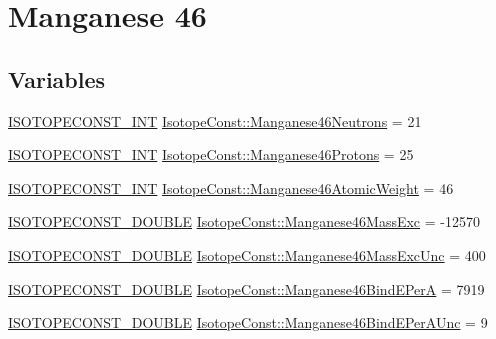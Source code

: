 \hypertarget{group___isotope_const-_manganese-_mn46}{}\section{Manganese 46}
\label{group___isotope_const-_manganese-_mn46}
\subsection*{Variables}
\begin{DoxyCompactItemize}
\item 
\mbox{\hyperlink{group___isotope_const-_macros_ga5f18360b3e99483a35c32d789e62621c}{I\+S\+O\+T\+O\+P\+E\+C\+O\+N\+S\+T\+\_\+\+I\+NT}} \mbox{\hyperlink{group___isotope_const-_manganese-_mn46_gaca758ecd628b140a9e0717aac8f4553d}{Isotope\+Const\+::\+Manganese46\+Neutrons}} = 21
\item 
\mbox{\hyperlink{group___isotope_const-_macros_ga5f18360b3e99483a35c32d789e62621c}{I\+S\+O\+T\+O\+P\+E\+C\+O\+N\+S\+T\+\_\+\+I\+NT}} \mbox{\hyperlink{group___isotope_const-_manganese-_mn46_gacc1f227c960bc2ff72ec1f9a623266e4}{Isotope\+Const\+::\+Manganese46\+Protons}} = 25
\item 
\mbox{\hyperlink{group___isotope_const-_macros_ga5f18360b3e99483a35c32d789e62621c}{I\+S\+O\+T\+O\+P\+E\+C\+O\+N\+S\+T\+\_\+\+I\+NT}} \mbox{\hyperlink{group___isotope_const-_manganese-_mn46_gaa6cc31407f8a75ad7933ccee10d4ecf9}{Isotope\+Const\+::\+Manganese46\+Atomic\+Weight}} = 46
\item 
\mbox{\hyperlink{group___isotope_const-_macros_ga8f45a7272ce02c0b4c65c44636ed719a}{I\+S\+O\+T\+O\+P\+E\+C\+O\+N\+S\+T\+\_\+\+D\+O\+U\+B\+LE}} \mbox{\hyperlink{group___isotope_const-_manganese-_mn46_ga89c83f5b0b1227b12597121b02b189dc}{Isotope\+Const\+::\+Manganese46\+Mass\+Exc}} = -\/12570
\item 
\mbox{\hyperlink{group___isotope_const-_macros_ga8f45a7272ce02c0b4c65c44636ed719a}{I\+S\+O\+T\+O\+P\+E\+C\+O\+N\+S\+T\+\_\+\+D\+O\+U\+B\+LE}} \mbox{\hyperlink{group___isotope_const-_manganese-_mn46_gae249e9f74260aabd4c170bc2c7dc8445}{Isotope\+Const\+::\+Manganese46\+Mass\+Exc\+Unc}} = 400
\item 
\mbox{\hyperlink{group___isotope_const-_macros_ga8f45a7272ce02c0b4c65c44636ed719a}{I\+S\+O\+T\+O\+P\+E\+C\+O\+N\+S\+T\+\_\+\+D\+O\+U\+B\+LE}} \mbox{\hyperlink{group___isotope_const-_manganese-_mn46_gab2b65df0c1a1bd6cb08805b82bf2da43}{Isotope\+Const\+::\+Manganese46\+Bind\+E\+PerA}} = 7919
\item 
\mbox{\hyperlink{group___isotope_const-_macros_ga8f45a7272ce02c0b4c65c44636ed719a}{I\+S\+O\+T\+O\+P\+E\+C\+O\+N\+S\+T\+\_\+\+D\+O\+U\+B\+LE}} \mbox{\hyperlink{group___isotope_const-_manganese-_mn46_gace2e117656956354576cc9acee07797b}{Isotope\+Const\+::\+Manganese46\+Bind\+E\+Per\+A\+Unc}} = 9

\end{DoxyCompactItemize}
